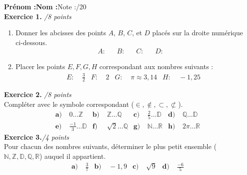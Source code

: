 \documentclass[11pt]{article}
\begin{document}

\noindent\textbf{Prénom :}\hfill\textbf{Nom :}\hfill Note
:\hspace{1.5cm}/20\vspace{.5cm}\\
\textbf{Exercice 1.} \hspace{2cm}\emph{/8 points}\\
\begin{enumerate}
  \item Donner les abcisses des points $A$, $B$, $C$, et $D$ placés sur la droite
numérique ci-dessous.
\begin{align*}
  A:& &
  B:& &
  C:& &
  D:&
\end{align*}
  \item Placer les points $E, F, G, H$ correspondant aux nombres suivants :
    \begin{align*}
      E:&\; \frac{3}{2} &
      F:&\; 2 &
      G:&\; \pi\approx 3,14 &
      H:&\; -1,25
    \end{align*}
\end{enumerate}
\begin{center}
\end{center}
\noindent \textbf{Exercice 2.} \hspace{2cm}\emph{/8 points}\\
Compléter avec le symbole correspondant ($\in, \notin, \subset, \not\subset$).
\begin{align*}
  \textbf{a)}\; & 0 \ldots \mathbb{Z} &
  \textbf{b)}\; & \mathbb{Z} \ldots \mathbb{Q} &
  \textbf{c)}\; & \frac{2}{5} \ldots \mathbb{D} &
  \textbf{d)}\; & \mathbb{Q} \ldots \mathbb{D} \\
  \textbf{e)}\; & \frac{-1}{3} \ldots \mathbb{D} &
  \textbf{f)}\; & \sqrt 2 \ldots \mathbb{Q} &
  \textbf{g)}\; & \mathbb{N} \ldots \mathbb{R} &
  \textbf{h)}\; & 2\pi \ldots \mathbb{R}
\end{align*}
\textbf{Exercice 3.}\hspace{2cm}\emph{/4 points}\\
{\small Pour chacun des nombres suivants, déterminer le plus petit ensemble
($\mathbb{N}, \mathbb{Z}, \mathbb{D}, \mathbb{Q}, \mathbb{R}$) auquel il
appartient.}
\begin{align*}
  \textbf{a)}&\;\frac{3}{7} &
  \textbf{b)}&\;-1,9 &
  \textbf{c)}&\;\sqrt{9} &
  \textbf{d)}&\;\frac{-6}{5}
\end{align*}
\end{document}
